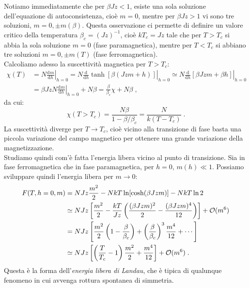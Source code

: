 \documentclass[10pt,a4paper]{report}
\theoremstyle{definition}
\newcommand{\dev}[3][]{\frac{\mathrm{d}^{#1} #2}{\mathrm{d} #3^{#1}}}
\numberwithin{equation}{section}
\newcommand{\diff}[1][]{\mathrm{d}#1}
\begin{document}
Notiamo immediatamente che per $\beta Jz<1$, esiste una sola soluzione dell'equazione di autoconsistenza, cioè $m=0$, mentre per $\beta Jz>1$ vi sono tre soluzioni, $m=0, \pm m(\beta)$. Questa osservazione ci permette di definire un valore critico della temperatura $\beta_c=(Jz)^{-1}$, cioè $kT_c=Jz$ tale che per $T>T_c$ si abbia la sola soluzione $m=0$ (fase paramagnetica), mentre per $T<T_c$ si abbiano tre soluzioni $m=0,\pm m(T)$ (fase ferromagnetica). \\
Calcoliamo adesso la suscettività magnetica per $T>T_c$:
\begin{align*}
\chi(T) &= N\left.\dev{m}{h}\right|_{h=0}=N\left.\frac{\diff}{\diff{h}}\tanh[\beta(Jzm+h)]\right|_{h=0}\simeq N\left.\frac{\diff}{\diff{h}}[\beta Jzm+\beta h]\right|_{h=0} \\
&=\beta Jz N\left.\dev{m}{h}\right|_{h=0}+N\beta=\frac{\beta}{\beta_c}\chi+N\beta\;,
\end{align*}
da cui:
\begin{equation}
\boxed{\chi(T>T_c)=\frac{N\beta}{1-\beta/\beta_c}=\frac{N}{k(T-T_c)}}\;.
\end{equation}
La suscettività diverge per $T\to T_c$, cioè vicino alla transizione di fase basta una piccola variazione del campo magnetico per ottenere una grande variazione della magnetizzazione. \\
Studiamo quindi com'è fatta l'energia libera vicino al punto di transizione. Sia in fase ferromagnetica che in fase paramagnetica, per $h=0$, $m(h)\ll 1$. Possiamo sviluppare quindi l'energia libera per $m\to 0$:
\begin{align}
F(T,h=0,m) &= NJz\frac{m^2}{2}-NkT\ln[\cosh(\beta Jzm)]-NkT\ln 2 \notag \\
&\simeq NJz\left[\frac{m^2}{2}-\frac{kT}{Jz}\left(\frac{(\beta Jzm)^2}{2}-\frac{(\beta Jzm)^4}{12}\right)\right]+\mathcal{O}(m^6) \notag \\
&= NJz\left[\frac{m^2}{2}\left(1-\frac{\beta}{\beta_c}\right)+\left(\frac{\beta}{\beta_c}\right)^3\frac{m^4}{12}+\cdots\right] \notag \\
&\simeq  NJz\left[\left(\frac{T}{T_c}-1\right)\frac{m^2}{2}+\frac{m^4}{12}\right]+\mathcal{O}(m^6)\;. \label{ch4_landaufreeenergy}
\end{align}
Questa è la forma dell'\emph{energia libera di Landau}, che è tipica di qualunque fenomeno in cui avvenga rottura spontanea di simmetria.
\end{document}
